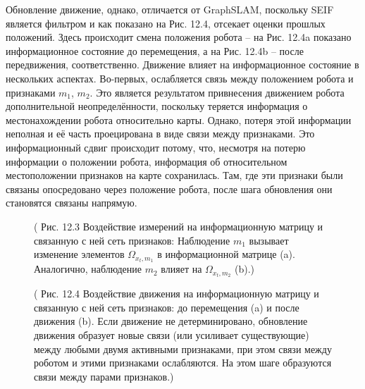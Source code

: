\documentclass[10pt,a4paper]{article}
\begin{document}
Обновление движение, однако, отличается от GraphSLAM, поскольку SEIF является фильтром и как показано на Рис. 12.4, отсекает оценки прошлых положений. Здесь происходит смена положения робота – на Рис. 12.4a показано информационное состояние до перемещения, а на Рис. 12.4b – после передвижения, соответственно. Движение влияет на информационное состояние в нескольких аспектах. Во-первых, ослабляется связь между положением робота и признаками $m_1$, $m_2$. Это является результатом привнесения движением робота дополнительной неопределённости, поскольку теряется информация о местонахождении робота относительно карты. Однако, потеря этой информации неполная и её часть проецирована в виде связи между признаками. Это информационный сдвиг происходит потому, что, несмотря на потерю информации о положении робота, информация об относительном местоположении признаков на карте сохранилась. Там, где эти признаки были связаны опосредовано через положение робота, после шага обновления они становятся связаны напрямую.

\begin{figure}[H]
	\caption{ ( Рис. 12.3 Воздействие измерений на информационную матрицу и связанную с ней сеть признаков: Наблюдение $m_1$ вызывает изменение элементов $\varOmega_{x_t,m_1}$  в информационной матрице (a).  Аналогично, наблюдение $m_2$ влияет на $\varOmega_{x_t,m_2}$ (b).) }
	\label{fig:123orig}
\end{figure}

\begin{figure}[H]
	\caption{ ( Рис. 12.4 Воздействие движения на информационную матрицу и связанную с ней сеть признаков: до перемещения (a) и  после движения (b). Если движение не детерминировано, обновление движения образует новые связи (или усиливает существующие) между любыми двумя активными признаками, при этом связи между роботом и этими признаками ослабляются. На этом шаге образуются связи между парами признаков.) }
	\label{fig:124orig}
\end{figure}
\end{document}

